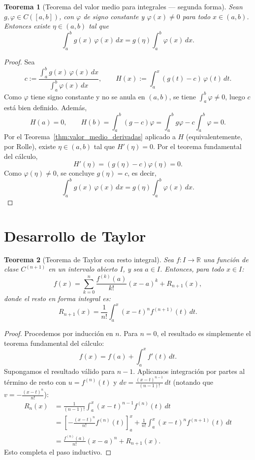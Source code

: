\documentclass[a4paper,11pt]{report}
\newtheorem{theorem}{Teorema}[chapter]
\begin{document}
\begin{theorem}[Teorema del valor medio para integrales --- segunda forma]\label{thm:valor_medio_integral_2}
Sean $g,\varphi\in C([a,b])$, con $\varphi$ de signo constante y $\varphi(x)\neq 0$ para todo $x\in(a,b)$.  Entonces existe $\eta\in(a,b)$ tal que
\[
\int_a^b g(x)\,\varphi(x)\,dx = g(\eta)\int_a^b \varphi(x)\,dx.
\]
\end{theorem}
\begin{proof}
Sea
\[
c:=\frac{\int_a^b g(x)\,\varphi(x)\,dx}{\int_a^b \varphi(x)\,dx},
\qquad
H(x):=\int_a^x (g(t)-c)\,\varphi(t)\,dt.
\]
Como $\varphi$ tiene signo constante y no se anula en $(a,b)$, se tiene $\int_a^b\varphi\neq 0$, luego $c$ está bien definido. Además,
\[
H(a)=0,
\qquad
H(b)=\int_a^b (g-c)\varphi=\int_a^b g\varphi-c\int_a^b\varphi=0.
\]
Por el Teorema~\ref{thm:valor_medio_derivadas} aplicado a $H$ (equivalentemente, por Rolle), existe $\eta\in(a,b)$ tal que $H'(\eta)=0$. Por el teorema fundamental del cálculo,
\[
H'(\eta)=(g(\eta)-c)\varphi(\eta)=0.
\]
Como $\varphi(\eta)\neq 0$, se concluye $g(\eta)=c$, es decir,
\[
\int_a^b g(x)\,\varphi(x)\,dx = g(\eta)\int_a^b \varphi(x)\,dx.
\]
\end{proof}

\section{Desarrollo de Taylor}

\begin{theorem}[Teorema de Taylor con resto integral]\label{thm:taylor}
Sea $f: I \to \mathbb{R}$ una función de clase $C^{(n+1)}$ en un intervalo abierto $I$, y sea $a \in I$. Entonces, para todo $x \in I$:
\[
f(x) = \sum_{k=0}^{n} \frac{f^{(k)}(a)}{k!}(x-a)^k + R_{n+1}(x),
\]
donde el resto en forma integral es:
\[
R_{n+1}(x) = \frac{1}{n!} \int_a^x (x-t)^n f^{(n+1)}(t)\, dt.
\]
\end{theorem}

\begin{proof}
Procedemos por inducción en $n$. Para $n = 0$, el resultado es simplemente el teorema fundamental del cálculo:
\[
f(x) = f(a) + \int_a^x f'(t)\, dt.
\]
Supongamos el resultado válido para $n-1$. Aplicamos integración por partes al término de resto con $u = f^{(n)}(t)$ y $dv = \frac{(x-t)^{n-1}}{(n-1)!}\, dt$ (notando que $v = -\frac{(x-t)^n}{n!}$):
\begin{align*}
R_n(x) &= \frac{1}{(n-1)!} \int_a^x (x-t)^{n-1} f^{(n)}(t)\, dt \\
&= \left[ -\frac{(x-t)^n}{n!} f^{(n)}(t) \right]_a^x + \frac{1}{n!} \int_a^x (x-t)^n f^{(n+1)}(t)\, dt \\
&= \frac{f^{(n)}(a)}{n!}(x-a)^n + R_{n+1}(x).
\end{align*}
Esto completa el paso inductivo.
\end{proof}
\end{document}
